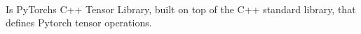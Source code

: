 \begin{defnbox}\nospacing
    \begin{defn}[ATen]\label{defn:aten}\leavevmode\\
        Is PyTorchs C++ Tensor Library, built on top of the C++ standard library, that defines Pytorch tensor operations.
    \end{defn}
\end{defnbox}
